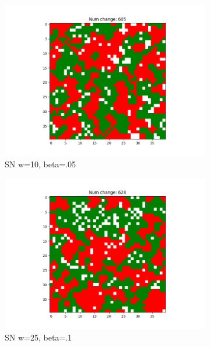 \documentclass[11pt]{article}
\begin{document}
\begin{figure}[h]
\begin{subfigure}{0.14\textwidth}
			\includegraphics[width=\linewidth]{final_rachael_w10b5.png}
			\caption{\centering SN w=10, beta=.05}
			\label{sn_finalw10b10}
		\end{subfigure}\hfill
		\begin{subfigure}{0.14\textwidth}
			\includegraphics[width=\linewidth]{final_rachael_w25b5.png}
			\caption{\centering SN w=25, beta=.1}
			\label{sn_finalw20b10}
		\end{subfigure}\hfill
		\begin{subfigure}{0.14\textwidth}

\end{subfigure}
\end{figure}
\end{document}
